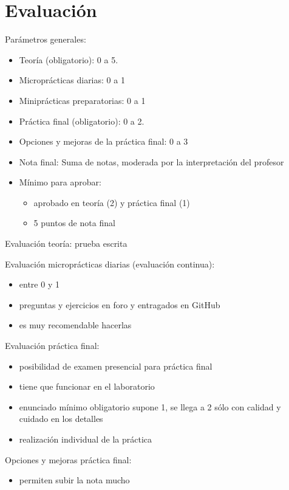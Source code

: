 \documentclass[a4paper,12pt]{article}
\begin{document}
\section{Evaluación}

Parámetros generales:

\begin{itemize}
\item Teoría (obligatorio): 0 a 5.
\item Microprácticas diarias: 0 a 1
\item Miniprácticas preparatorias: 0 a 1
\item Práctica final (obligatorio): 0 a 2.
\item Opciones y mejoras de la práctica final: 0 a 3
\item Nota final: Suma de notas, moderada por la interpretación del profesor
\item Mínimo para aprobar:
      \begin{itemize}
      \item aprobado en teoría (2) y práctica final (1)
      \item 5 puntos de nota final
      \end{itemize}
\end{itemize}

Evaluación teoría: prueba escrita

Evaluación microprácticas diarias (evaluación continua):

\begin{itemize}
\item entre 0 y 1
\item preguntas y ejercicios en foro y entragados en GitHub
\item es muy recomendable hacerlas
\end{itemize}

Evaluación práctica final:

\begin{itemize}
\item posibilidad de examen presencial para práctica final
\item tiene que funcionar en el laboratorio
\item enunciado mínimo obligatorio supone 1, se llega a 2 sólo con calidad y cuidado en los detalles
\item realización individual de la práctica
\end{itemize}

Opciones y mejoras práctica final:

\begin{itemize}
\item permiten subir la nota mucho
\end{itemize}
\end{document}
